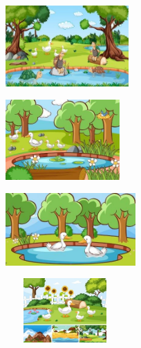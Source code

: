 \begin{escolha}
\item \includegraphics[width=1.85903in,height=1.21806in]{media/image250.jpg}

\item \includegraphics[width=1.71806in,height=1.21875in]{media/image251.jpg}

\item \includegraphics[width=1.96319in,height=1.09028in]{media/image252.jpg}

\item \includegraphics[width=1.78681in,height=0.96806in]{media/image253.jpg}
\end{escolha}



